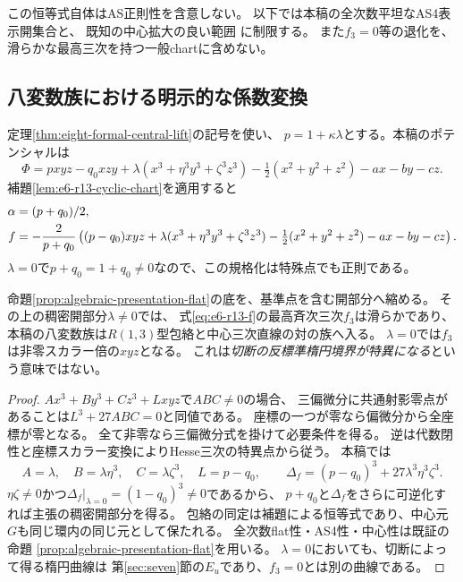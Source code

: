 この恒等式自体はAS正則性を含意しない。
以下では本稿の全次数平坦なAS4表示開集合と、
既知の中心拡大の良い範囲 \cite{LBS,EG,PymR13}に制限する。
また$f_3=0$等の退化を、滑らかな最高三次を持つ一般chartに含めない。

\subsection{八変数族における明示的な係数変換}
定理\ref{thm:eight-formal-central-lift}の記号を使い、
$p=1+\kappa\lambda$とする。本稿のポテンシャルは
\[
 \Phi=pxyz-q_0xzy+\lambda(x^3+\eta^3y^3+\zeta^3z^3)
       -\tfrac12(x^2+y^2+z^2)-ax-by-cz.
\]
補題\ref{lem:e6-r13-cyclic-chart}を適用すると
\begin{align}
 \alpha&=(p+q_0)/2,\notag\\
 f&=-\frac{2}{p+q_0}\left(
 (p-q_0)xyz+\lambda(x^3+\eta^3y^3+\zeta^3z^3)
 -\tfrac12(x^2+y^2+z^2)-ax-by-cz\right).
 \label{eq:e6-r13-f}
\end{align}
$\lambda=0$で$p+q_0=1+q_0\ne0$なので、この規格化は特殊点でも正則である。

\begin{proposition}[一般包絡の$R(1,3)$表示]
\label{prop:e6-r13-generic-envelope}
命題\ref{prop:algebraic-presentation-flat}の底を、基準点を含む開部分へ縮める。
その上の稠密開部分$\lambda\ne0$では、
式\eqref{eq:e6-r13-f}の最高斉次三次$f_3$は滑らかであり、
本稿の八変数族は$R(1,3)$型包絡と中心三次直線の対の族へ入る。
$\lambda=0$では$f_3$は非零スカラー倍の$xyz$となる。
これは\emph{切断の反標準楕円境界が特異になる}という意味ではない。
\end{proposition}
\begin{proof}
$A x^3+B y^3+C z^3+Lxyz$で$ABC\ne0$の場合、
三偏微分に共通射影零点があることは$L^3+27ABC=0$と同値である。
座標の一つが零なら偏微分から全座標が零となる。
全て非零なら三偏微分式を掛けて必要条件を得る。
逆は代数閉性と座標スカラー変換によりHesse三次の特異点から従う。
本稿では
\[
 A=\lambda,\quad B=\lambda\eta^3,\quad C=\lambda\zeta^3,
 \quad L=p-q_0,
 \qquad \Delta_f=(p-q_0)^3+27\lambda^3\eta^3\zeta^3.
\]
$\eta\zeta\ne0$かつ$\Delta_f|_{\lambda=0}=(1-q_0)^3\ne0$であるから、
$p+q_0$と$\Delta_f$をさらに可逆化すれば主張の稠密開部分を得る。
包絡の同定は補題による恒等式であり、中心元$G$も同じ環内の同じ元として保たれる。
全次数flat性・AS4性・中心性は既証の命題
\ref{prop:algebraic-presentation-flat}を用いる。
$\lambda=0$においても、切断によって得る楕円曲線は
第\ref{sec:seven}節の$E_u$であり、$f_3=0$とは別の曲線である。
\end{proof}

